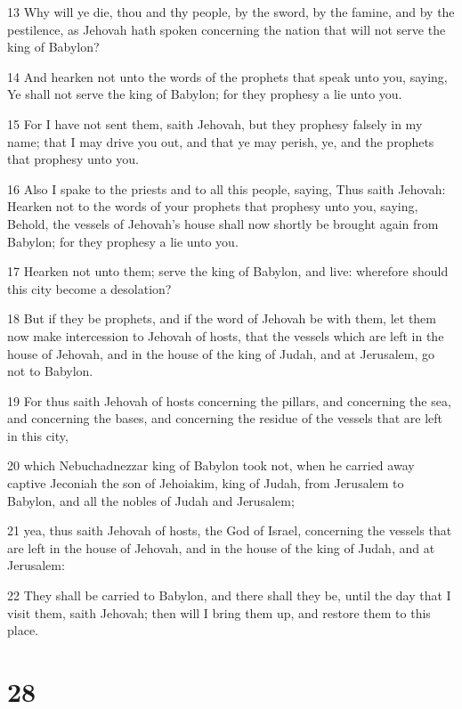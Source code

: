 \par 13 Why will ye die, thou and thy people, by the sword, by the famine, and by the pestilence, as Jehovah hath spoken concerning the nation that will not serve the king of Babylon?
\par 14 And hearken not unto the words of the prophets that speak unto you, saying, Ye shall not serve the king of Babylon; for they prophesy a lie unto you.
\par 15 For I have not sent them, saith Jehovah, but they prophesy falsely in my name; that I may drive you out, and that ye may perish, ye, and the prophets that prophesy unto you.
\par 16 Also I spake to the priests and to all this people, saying, Thus saith Jehovah: Hearken not to the words of your prophets that prophesy unto you, saying, Behold, the vessels of Jehovah's house shall now shortly be brought again from Babylon; for they prophesy a lie unto you.
\par 17 Hearken not unto them; serve the king of Babylon, and live: wherefore should this city become a desolation?
\par 18 But if they be prophets, and if the word of Jehovah be with them, let them now make intercession to Jehovah of hosts, that the vessels which are left in the house of Jehovah, and in the house of the king of Judah, and at Jerusalem, go not to Babylon.
\par 19 For thus saith Jehovah of hosts concerning the pillars, and concerning the sea, and concerning the bases, and concerning the residue of the vessels that are left in this city,
\par 20 which Nebuchadnezzar king of Babylon took not, when he carried away captive Jeconiah the son of Jehoiakim, king of Judah, from Jerusalem to Babylon, and all the nobles of Judah and Jerusalem;
\par 21 yea, thus saith Jehovah of hosts, the God of Israel, concerning the vessels that are left in the house of Jehovah, and in the house of the king of Judah, and at Jerusalem:
\par 22 They shall be carried to Babylon, and there shall they be, until the day that I visit them, saith Jehovah; then will I bring them up, and restore them to this place.

\chapter{28}


